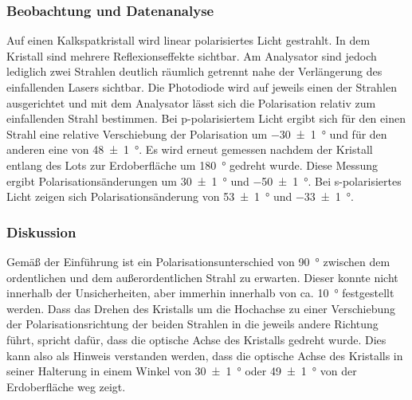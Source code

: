 \documentclass[
	a4paper,
	12pt,
	pagesize,
	ngerman
]{scrartcl}
\begin{document}
	\subsubsection{Beobachtung und Datenanalyse}
	Auf einen Kalkspatkristall wird linear polarisiertes Licht gestrahlt.
	In dem Kristall sind mehrere Reflexionseffekte sichtbar. 
	Am Analysator sind jedoch lediglich zwei Strahlen deutlich räumlich getrennt nahe der Verlängerung des einfallenden Lasers sichtbar.
	Die Photodiode wird auf jeweils einen der Strahlen ausgerichtet und mit dem Analysator lässt sich die Polarisation relativ zum einfallenden Strahl bestimmen.
	Bei p-polarisiertem Licht ergibt sich für den einen Strahl eine relative Verschiebung der Polarisation um \SI{-30+-1}{\degree} und für den anderen eine von \SI{48+-1}{\degree}.
	Es wird erneut gemessen nachdem der Kristall entlang des Lots zur Erdoberfläche um \SI{180}{\degree} gedreht wurde.
	Diese Messung ergibt Polarisationsänderungen um \SI{30+-1}{\degree} und \SI{-50+-1}{\degree}.
	Bei s-polarisiertes Licht zeigen sich Polarisationsänderung von \SI{53+-1}{\degree} und \SI{-33+-1}{\degree}.

	\subsubsection{Diskussion}
	Gemäß der Einführung ist ein Polarisationsunterschied von \SI{90}{\degree} zwischen dem ordentlichen und dem außerordentlichen Strahl zu erwarten.
	Dieser konnte nicht innerhalb der Unsicherheiten, aber immerhin innerhalb von ca. \SI{10}{\degree} festgestellt werden.
	Dass das Drehen des Kristalls um die Hochachse zu einer Verschiebung der Polarisationsrichtung der beiden Strahlen in die jeweils andere Richtung führt, spricht dafür, dass die optische Achse des Kristalls gedreht wurde.
	Dies kann also als Hinweis verstanden werden, dass die optische Achse des Kristalls in seiner Halterung in einem Winkel von \SI{30+-1}{\degree} oder \SI{49+-1}{\degree} von der Erdoberfläche weg zeigt.
	
	
\end{document}
